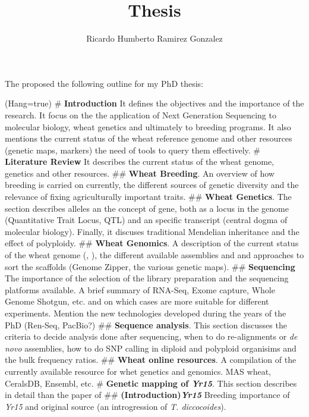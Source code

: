 \documentclass[12pt,a4paper]{book}
\author{Ricardo Humberto Ramirez Gonzalez}
\title{Thesis}
\begin{document}









The proposed the following outline for my PhD thesis:

\begin{easylist}
	\ListProperties(Hang=true)
	# \textbf{Introduction} It defines the objectives and the importance of the research. It focus on the the application of Next Generation Sequencing to molecular biology, wheat genetics and ultimately to breeding programs. It also mentions the current status of the wheat reference genome and other resources (genetic maps, markers) the need of tools to query them effectively. 
	# \textbf{Literature Review} It describes the current status of the wheat genome, genetics and other resources.   
	## \textbf{Wheat Breeding}. An overview of how breeding is carried on currently, the different sources of genetic diversity and the relevance of fixing agriculturally important traits. 
	## \textbf{Wheat Genetics}. The section describes alleles an the concept of gene, both as a locus in the genome (Quantitative Trait Locus, QTL) and an specific transcript (central dogma of molecular biology). Finally, it discuses traditional Mendelian inheritance and the effect of polyploidy.  
	## \textbf{Wheat Genomics}. A description of the current status of the wheat genome (\citet{Mayer2014}, \citet{Chapman2015}), the different available assemblies and and approaches to sort the scaffolds (Genome Zipper, the various genetic maps).  
	## \textbf{Sequencing} The importance of the selection of the library preparation and the sequencing platforms available. A brief summary of RNA-Seq, Exome capture, Whole Genome Shotgun, etc. and on which cases are more suitable for different experiments.  Mention the new technologies developed during the years of the PhD (Ren-Seq, PacBio?)
	## \textbf{Sequence analysis}. This section discusses the criteria to decide analysis done after sequencing, when to do re-alignments or \textit{de novo} assemblies, how to do SNP calling in diploid and polyploid organisims and the bulk frequency ratios.  
	## \textbf{Wheat online resources}. A compilation of the currently available resource for whet genetics and genomics. MAS wheat, CeralsDB, Ensembl, etc.   
	# \textbf{Genetic mapping of \textit{Yr15}}. This section describes in detail than the paper of \citet{Ramirez-Gonzalez-2014}
	## \textbf{(Introduction)\textit{Yr15}} Breeding importance of \textit{Yr15} and original source (an introgression of \textit{T. diccocoides}). 

\end{easylist}
\end{document}
